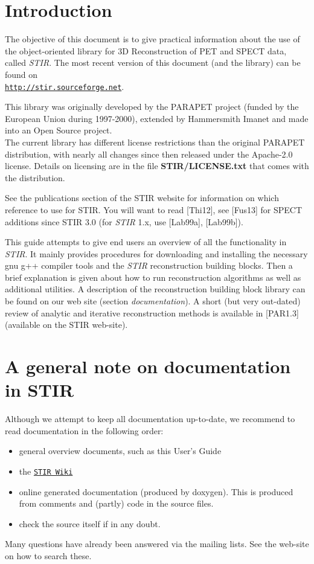 \documentclass{article}
\def\url#1#2{\mbox{\href{#1}{\tt #2}}}
\begin{document}
\tableofcontents




\section{
Introduction}

The objective of this document is to give practical information 
about the use of the object-oriented library for 3D Reconstruction 
of PET and SPECT data, called \textit{STIR}. The most recent version of this 
document (and the library) can be found on \\
\url{http://stir.sourceforge.net}{http://stir.sourceforge.net}.


This library was originally developed by the PARAPET 
project (funded by the European Union during 1997-2000), extended by Hammersmith 
Imanet and made into an Open Source project. \\
The current library has different license restrictions than the 
original PARAPET distribution, with nearly all changes since then released under the Apache-2.0 license.
Details on licensing are in the file \textbf{STIR/LICENSE.txt} 
that comes with the distribution. 

See the publications section of the STIR website for information on which reference
to use for STIR. You will want to read {[}Thi12], see {[}Fus13] for SPECT additions
since STIR 3.0 (for \textit{STIR} 1.x, use [Lab99a], [Lab99b]).



This guide attempts to give end users an overview of all the functionality
in \textit{STIR}. It mainly provides 
procedures for downloading and installing the necessary gnu g++ 
compiler tools and the \textit{STIR} reconstruction building blocks. 
Then a brief explanation is given about how to run reconstruction 
algorithms as well as additional utilities. A description of 
the reconstruction building block library can be found on our 
web site (section \textit{documentation}). A short (but very out-dated) review of analytic 
and iterative reconstruction methods is available in [PAR1.3] 
(available on the STIR web-site).

\section{
A general note on documentation in STIR}

Although we attempt to keep all documentation up-to-date, we 
recommend to read documentation in the following order:
\begin{itemize}
\item general overview documents, such as this User's Guide
\item the \url{https://github.com/UCL/STIR/wiki/}{STIR Wiki}
\item 
online generated documentation (produced by doxygen). This is 
produced from comments and (partly) code in the source files.
\item check the source itself if in any doubt.
\end{itemize}
Many questions have already been answered via the mailing lists. See the
web-site on how to search these.
\end{document}
